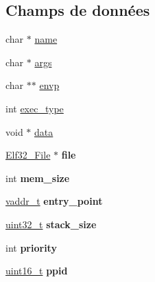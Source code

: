 \subsection*{Champs de données}
\begin{DoxyCompactItemize}
\item 
char $\ast$ \hyperlink{structprocess__init__data__t_a6bdcab0bceaafa6e65a236904fb5a157}{name}
\item 
char $\ast$ \hyperlink{structprocess__init__data__t_a16d011771835f06e0bb3d5fd6115e13c}{args}
\item 
char $\ast$$\ast$ \hyperlink{structprocess__init__data__t_a863d82fbd718f53164a520f67376eac2}{envp}
\item 
int \hyperlink{structprocess__init__data__t_a1cda790f7d2446a04562094f09e358ab}{exec\-\_\-type}
\item 
void $\ast$ \hyperlink{structprocess__init__data__t_ae950cc2a2cc04d1c00a71f70c2fde72c}{data}
\item 
\hypertarget{structprocess__init__data__t_a423d726f5e4621a1aae6a6d96ed2c380}{\hyperlink{structElf32__File}{Elf32\-\_\-\-File} $\ast$ {\bfseries file}}\label{structprocess__init__data__t_a423d726f5e4621a1aae6a6d96ed2c380}

\item 
\hypertarget{structprocess__init__data__t_ae720e802d58d2f1457e34998063695a1}{int {\bfseries mem\-\_\-size}}\label{structprocess__init__data__t_ae720e802d58d2f1457e34998063695a1}

\item 
\hypertarget{structprocess__init__data__t_acf333ed57db9a2ca636801dcbc41da7e}{\hyperlink{kernel_2include_2types_8h_a53428b953a0ae6fba02a5b3596c867e0}{vaddr\-\_\-t} {\bfseries entry\-\_\-point}}\label{structprocess__init__data__t_acf333ed57db9a2ca636801dcbc41da7e}

\item 
\hypertarget{structprocess__init__data__t_a8a9c2d2d0d602f8e2f3dc2f4c425da29}{\hyperlink{kernel_2include_2types_8h_a33594304e786b158f3fb30289278f5af}{uint32\-\_\-t} {\bfseries stack\-\_\-size}}\label{structprocess__init__data__t_a8a9c2d2d0d602f8e2f3dc2f4c425da29}

\item 
\hypertarget{structprocess__init__data__t_a3147915ee1aa09fd84245e28635c60c8}{int {\bfseries priority}}\label{structprocess__init__data__t_a3147915ee1aa09fd84245e28635c60c8}

\item 
\hypertarget{structprocess__init__data__t_a34f85f3f56546700b1dc942070944e27}{\hyperlink{kernel_2include_2types_8h_adf4d876453337156dde61095e1f20223}{uint16\-\_\-t} {\bfseries ppid}}\label{structprocess__init__data__t_a34f85f3f56546700b1dc942070944e27}

\end{DoxyCompactItemize}


